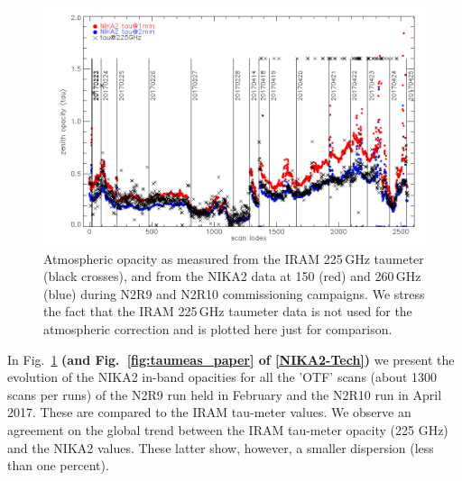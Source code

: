 \begin{figure}[ht]
\begin{center}
\includegraphics[width=\linewidth]{Figures/opacity_vs_index_N2R9_N2R10.png}
\caption{Atmospheric opacity as measured from the IRAM 225\,GHz
  taumeter (black crosses), and from the NIKA2 data at 150 (red) and 260\,GHz (blue) during 
  N2R9 and N2R10 commissioning campaigns.  We stress the fact that the IRAM 225\,GHz taumeter data is not used for the atmospheric correction and is plotted here just for comparison.
  \label{fig:taumeas}}
\end{center}
\end{figure}


In Fig.~\ref{fig:taumeas} {\bf(and Fig.~\ref{fig:taumeas_paper} of
  \ref{NIKA2-Tech}) } we present the evolution of the NIKA2 in-band
opacities for all the 'OTF' scans (about 1300 scans per runs) of the
N2R9 run held in February and the N2R10 run in April 2017. These are
compared to the IRAM tau-meter values. We observe an agreement on the global trend between the IRAM tau-meter opacity (225 GHz) and the NIKA2 values. These latter show, however,
a smaller dispersion (less than one percent).


